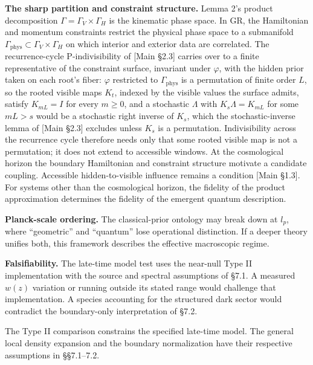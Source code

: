 \documentclass[
]{article}
\begin{document}
\textbf{The sharp partition and constraint structure.} Lemma 2's product
decomposition \(\Gamma = \Gamma_V \times \Gamma_H\) is the kinematic
phase space. In GR, the Hamiltonian and momentum constraints restrict
the physical phase space to a submanifold
\(\Gamma_{\text{phys}} \subset \Gamma_V \times \Gamma_H\) on which
interior and exterior data are correlated. The recurrence-cycle
P-indivisibility of {[}Main §2.3{]} carries over to a finite
representative of the constraint surface, invariant under \(\varphi\),
with the hidden prior taken on each root's fiber: \(\varphi\) restricted
to \(\Gamma_{\text{phys}}\) is a permutation of finite order \(L\), so
the rooted visible maps \(K_t\), indexed by the visible values the
surface admits, satisfy \(K_{mL} = I\) for every \(m \geq 0\), and a
stochastic \(\Lambda\) with \(K_s \Lambda = K_{mL}\) for some \(mL > s\)
would be a stochastic right inverse of \(K_s\), which the
stochastic-inverse lemma of {[}Main §2.3{]} excludes unless \(K_s\) is a
permutation. Indivisibility across the recurrence cycle therefore needs
only that some rooted visible map is not a permutation; it does not
extend to accessible windows. At the cosmological horizon the boundary
Hamiltonian and constraint structure motivate a candidate coupling.
Accessible hidden-to-visible influence remains a condition {[}Main
§1.3{]}. For systems other than the cosmological horizon, the fidelity
of the product approximation determines the fidelity of the emergent
quantum description.

\textbf{Planck-scale ordering.} The classical-prior ontology may break
down at \(l_p\), where ``geometric'' and ``quantum'' lose operational
distinction. If a deeper theory unifies both, this framework describes
the effective macroscopic regime.

\textbf{Falsifiability.} The late-time model test uses the near-null
Type II implementation with the source and spectral assumptions of §7.1.
A measured \(w(z)\) variation or running outside its stated range would
challenge that implementation. A species accounting for the structured
dark sector would contradict the boundary-only interpretation of §7.2.

The Type II comparison constrains the specified late-time model. The
general local density expansion and the boundary normalization have
their respective assumptions in §§7.1--7.2.
\end{document}
